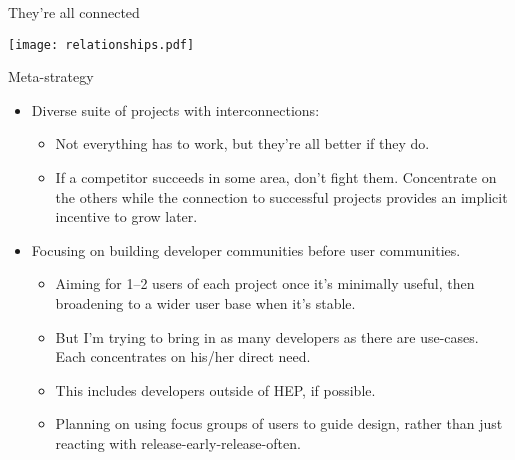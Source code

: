 \documentclass{beamer}
\begin{document}
\begin{frame}{They're all connected}
\begin{center}
\texttt{[image: relationships.pdf]}
\end{center}
\end{frame}

\begin{frame}{Meta-strategy}
\vspace{0.25 cm}
\begin{itemize}
\item Diverse suite of projects with interconnections:
\begin{itemize}
\item Not everything has to work, but they're all better if they do.
\item If a competitor succeeds in some area, don't fight them. Concentrate on the others while the connection to successful projects provides an implicit incentive to grow later.
\end{itemize}

\item Focusing on building developer communities before user communities.
\begin{itemize}
\item Aiming for 1--2 users of each project once it's minimally useful, then broadening to a wider user base when it's stable.
\item But I'm trying to bring in as many developers as there are use-cases. Each concentrates on his/her direct need.
\item This includes developers outside of HEP, if possible.
\item Planning on using focus groups of users to guide design, rather than just reacting with release-early-release-often.
\end{itemize}
\end{itemize}
\end{frame}
\end{document}
